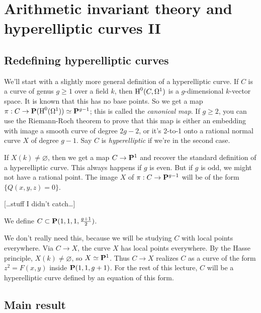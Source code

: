 
\section{Arithmetic invariant theory and hyperelliptic curves II}\label{sec:gross-ii}





\subsection{Redefining hyperelliptic curves}

We'll start with a slightly more general definition of a hyperelliptic curve. 
If $C$ is a curve of genus $g\geqslant 1$ over a field $k$, then 
$\operatorname{H}^0(C,\Omega^1)$ is a $g$-dimensional $k$-vector space. It is known that this 
has no base points. So we get a map 
$\pi:C\to \mathbf{P}(\operatorname{H}^0(\Omega^1))\simeq \mathbf{P}^{g-1}$; this is called the 
\emph{canonical map}. If $g\geqslant 2$, you can use the Riemann-Roch theorem 
to prove that this map is either an embedding with image a smooth curve of 
degree $2 g-2$, or it's 2-to-1 onto a rational normal curve $X$ of degree 
$g-1$. Say $C$ is \emph{hyperelliptic} if we're in the second case. 

If $X(k)\ne\varnothing$, then we get a map $C\to \mathbf{P}^1$ and recover the 
standard definition of a hyperelliptic curve. This always happens if $g$ is 
even. But if $g$ is odd, we might not have a rational point. The 
image $X$ of $\pi:C\to \mathbf{P}^{g-1}$ will be of the form $\{Q(x,y,z)=0\}$. 

[\ldots stuff I didn't catch\ldots]

We define $C\subset \mathbf{P}(1,1,1,\frac{g+1}{2})$. 

We don't really need this, because we will be studying $C$ with local points 
everywhere. Via $C\to X$, the curve $X$ has local points everywhere. By the 
Hasse principle, $X(k)\ne\varnothing$, so $X\simeq \mathbf{P}^1$. Thus $C\to X$ 
realizes $C$ as a curve of the form $z^2=F(x,y)$ inside 
$\mathbf{P}(1,1,g+1)$. For the rest of this lecture, $C$ will be a hyperelliptic 
curve defined by an equation of this form. 





\subsection{Main result}

